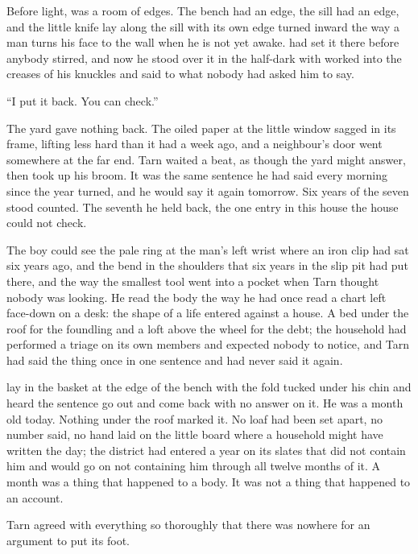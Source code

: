 
Before light,  was a room of edges. The bench had an edge, the sill had an edge, and the little knife lay along the sill with its own edge turned inward the way a man turns his face to the wall when he is not yet awake.  had set it there before anybody stirred, and now he stood over it in the half-dark with  worked into the creases of his knuckles and said to  what nobody had asked him to say.

“I put it back. You can check.”

The yard gave nothing back. The oiled paper at the little window sagged in its frame, lifting less hard than it had a week ago, and a neighbour's door went somewhere at the far end. Tarn waited a beat, as though the yard might answer, then took up his broom. It was the same sentence he had said every morning since the year turned, and he would say it again tomorrow. Six years of the seven stood counted. The seventh he held back, the one entry in this house the house could not check.

The boy could see the pale ring at the man's left wrist where an iron clip had sat six years ago, and the bend in the shoulders that six years in the slip pit had put there, and the way the smallest tool went into a pocket when Tarn thought nobody was looking. He read the body the way he had once read a chart left face-down on a desk: the shape of a life entered against a house. A bed under the roof for the foundling and a loft above the wheel for the debt; the household had performed a triage on its own members and expected nobody to notice, and Tarn had said the thing once in one sentence and had never said it again.

 lay in the basket at the edge of the bench with the fold tucked under his chin and heard the sentence go out and come back with no answer on it. He was a month old today. Nothing under the roof marked it. No loaf had been set apart, no number said, no hand laid on the little board where a household might have written the day; the district had entered a year on its slates that did not contain him and would go on not containing him through all twelve months of it. A month was a thing that happened to a body. It was not a thing that happened to an account.

Tarn agreed with everything so thoroughly that there was nowhere for an argument to put its foot.

